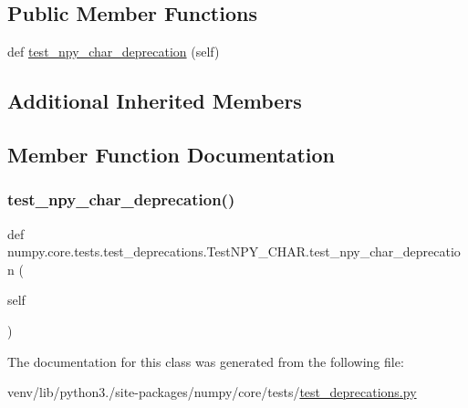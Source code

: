 \subsection*{Public Member Functions}
\begin{DoxyCompactItemize}
\item 
def \hyperlink{classnumpy_1_1core_1_1tests_1_1test__deprecations_1_1TestNPY__CHAR_af7c27645ba5ab97d1b7a811de600ba05}{test\+\_\+npy\+\_\+char\+\_\+deprecation} (self)
\end{DoxyCompactItemize}
\subsection*{Additional Inherited Members}


\subsection{Member Function Documentation}
\mbox{\label{classnumpy_1_1core_1_1tests_1_1test__deprecations_1_1TestNPY__CHAR_af7c27645ba5ab97d1b7a811de600ba05}} 
\subsubsection{\texorpdfstring{test\+\_\+npy\+\_\+char\+\_\+deprecation()}{test\_npy\_char\_deprecation()}}
{\footnotesize\ttfamily def numpy.\+core.\+tests.\+test\+\_\+deprecations.\+Test\+N\+P\+Y\+\_\+\+C\+H\+A\+R.\+test\+\_\+npy\+\_\+char\+\_\+deprecation (\begin{DoxyParamCaption}\item[{}]{self }\end{DoxyParamCaption})}



The documentation for this class was generated from the following file\+:\begin{DoxyCompactItemize}
\item 
venv/lib/python3./site-\/packages/numpy/core/tests/\hyperlink{core_2tests_2test__deprecations_8py}{test\+\_\+deprecations.\+py}\end{DoxyCompactItemize}
